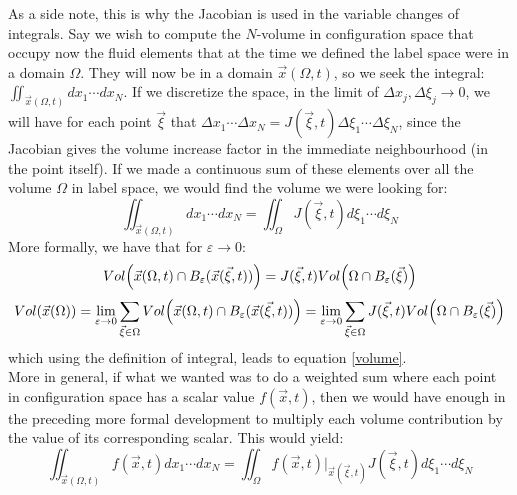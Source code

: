 \documentclass[11pt, a4paper]{article} %
\DeclareRobustCommand{\mybox}[2][gray!20]{%
\begin{tcolorbox}[   %
        left=1cm,
        right=1cm,
        top=0.5cm,
        bottom=0.5cm,
        colback=#1,
        colframe=#1,
        width=\dimexpr\textwidth\relax, 
        enlarge left by=0mm,
        boxsep=5pt,
        arc=0pt,outer arc=0pt,
        ]
        #2
\end{tcolorbox}
}
\begin{document}
 \mybox{
As a side note, this is why the Jacobian is used in the variable changes of integrals. Say we wish to compute the $N$-volume in configuration space that occupy now the fluid elements that at the time we defined the label space were in a domain $\Omega$. They will now be in a domain $\vec{x}(\Omega,t)$, so we seek the integral: $\iint_{\vec{x}(\Omega,t)}dx_1\cdots dx_N$. If we discretize the space, in the limit of $\Delta x_j, \Delta \xi_j \rightarrow 0$, we will have for each point $\vec{\xi}$ that $\Delta x_1\cdots \Delta x_N= J(\vec{\xi},t)\Delta \xi_1\cdots \Delta\xi_N$, since the Jacobian gives the volume increase factor in the immediate neighbourhood (in the point itself). If we made a continuous sum of these elements over all the volume $\Omega$ in label space, we would find the volume we were looking for:
\begin{equation}\label{volume}
\iint_{\vec{x}(\Omega,t)}dx_1\cdots dx_N=\iint_{\Omega} J(\vec{\xi},t) d\xi_1\cdots d\xi_N
\end{equation}
More formally, we have that for $\varepsilon \rightarrow 0$:
\begin{equation}
Vol\qty(\vec{x}(\Omega,t)\cap B_\varepsilon(\vec{x}(\vec{\xi},t)))=J(\vec{\xi},t)Vol\qty(\Omega \cap B_\varepsilon (\vec{\xi}))
\end{equation}
\begin{equation}
Vol\qty(\vec{x}(\Omega))=\lim_{ \varepsilon\rightarrow 0} \sum_{\vec{\xi}\in\Omega} Vol\qty(\vec{x}(\Omega,t)\cap B_\varepsilon(\vec{x}(\vec{\xi},t)))=\lim_{ \varepsilon\rightarrow 0} \sum_{\vec{\xi}\in\Omega} J(\vec{\xi},t)Vol\qty(\Omega \cap B_\varepsilon (\vec{\xi}))
\end{equation}
which using the definition of integral, leads to equation \eqref{volume}.\\

More in general, if what we wanted was to do a weighted sum where each point in configuration space has a scalar value $f(\vec{x},t)$, then we would have enough in the preceding more formal development to multiply each volume contribution by the value of its corresponding scalar. This would yield:
\begin{equation}\label{integralChange}
\iint_{\vec{x}(\Omega,t)}f(\vec{x},t)dx_1\cdots dx_N=\iint_{\Omega} f(\vec{x},t)\Big\rvert_{\vec{x}(\vec{\xi},t)}J(\vec{\xi},t) d\xi_1\cdots d\xi_N
\end{equation}

}
\end{document}
